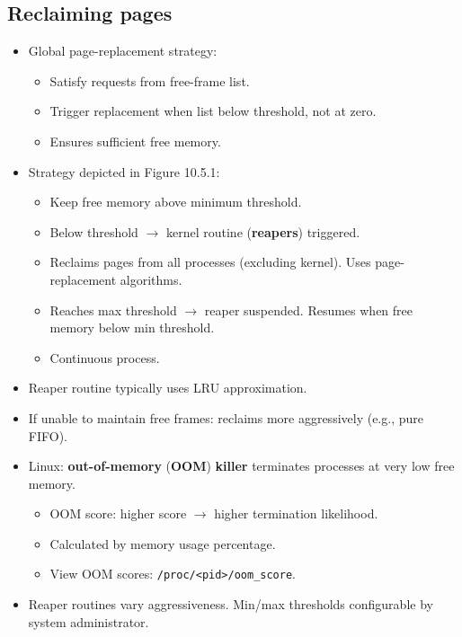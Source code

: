 \subsection{Reclaiming pages}
\begin{itemize}
    \item Global page-replacement strategy:
    \begin{itemize}
        \item Satisfy requests from free-frame list.
        \item Trigger replacement when list below threshold, not at zero.
        \item Ensures sufficient free memory.
    \end{itemize}
    \item Strategy depicted in Figure 10.5.1:
    \begin{itemize}
        \item Keep free memory above minimum threshold.
        \item Below threshold $\rightarrow$ kernel routine (\textbf{reapers}) triggered.
        \item Reclaims pages from all processes (excluding kernel). Uses page-replacement algorithms.
        \item Reaches max threshold $\rightarrow$ reaper suspended. Resumes when free memory below min threshold.
        \item Continuous process.
    \end{itemize}
    \item Reaper routine typically uses LRU approximation.
    \item If unable to maintain free frames: reclaims more aggressively (e.g., pure FIFO).
    \item Linux: \textbf{out-of-memory} (\textbf{OOM}) \textbf{killer} terminates processes at very low free memory.
    \begin{itemize}
        \item OOM score: higher score $\rightarrow$ higher termination likelihood.
        \item Calculated by memory usage percentage.
        \item View OOM scores: \texttt{/proc/<pid>/oom\_score}.
    \end{itemize}
    \item Reaper routines vary aggressiveness. Min/max thresholds configurable by system administrator.
\end{itemize}

